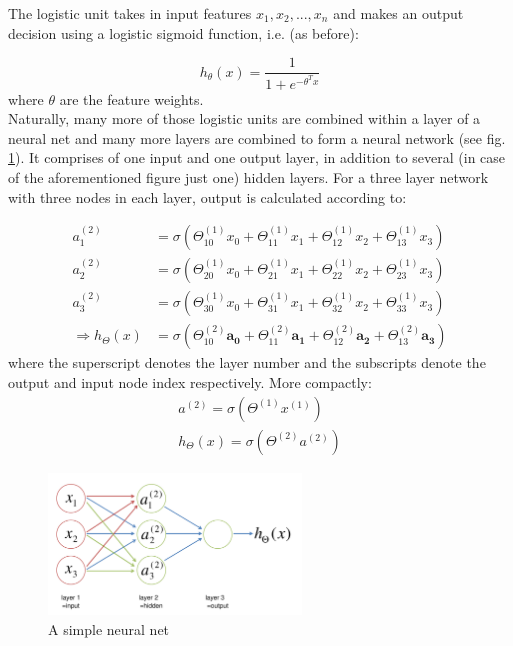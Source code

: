 \documentclass[a4paper, 12pt]{article}
\numberwithin{equation}{section}
\begin{document}
	The logistic unit takes in input features $x_1, x_2, ..., x_n$ and makes an output decision using a logistic sigmoid function, i.e. (as before):
	
	\begin{equation}
	h_\theta (x) = \frac{1}{1+e^{-\theta ^ T x}}
	\end{equation}
	where $\theta$ are the feature weights.\\
	
	Naturally, many more of those logistic units are combined within a layer of a neural net and many more layers are combined to form a neural network (see fig. \ref{fig:neural_net}). It comprises of one input and one output layer, in addition to several (in case of the aforementioned figure just one) hidden layers. For a three layer network with three nodes in each layer, output is calculated according to:
	
	\begin{align}
	a_1^{(2)} &= \sigma (\Theta_{10}^{(1)} x_0 + \Theta_{11}^{(1)} x_1  + \Theta_{12}^{(1)} x_2  + \Theta_{13}^{(1)} x_3) \\
	a_2^{(2)} &= \sigma (\Theta_{20}^{(1)} x_0 + \Theta_{21}^{(1)} x_1  + \Theta_{22}^{(1)} x_2  + \Theta_{23}^{(1)} x_3) \\
	a_3^{(2)} &= \sigma (\Theta_{30}^{(1)} x_0 + \Theta_{31}^{(1)} x_1  + \Theta_{32}^{(1)} x_2  + \Theta_{33}^{(1)} x_3) \\
	\Rightarrow h_{\Theta} (x) &= \sigma (\Theta_{10}^{(2)} \boldsymbol{a_0} + \Theta_{11}^{(2)} \boldsymbol{a_1}  + \Theta_{12}^{(2)} \boldsymbol{a_2}  + \Theta_{13}^{(2)} \boldsymbol{a_3})
	\end{align}
	where the superscript denotes the layer number and the subscripts denote the output and input node index respectively. More compactly:
	\begin{align}
	a^{(2)} = \sigma(\Theta^{(1)} x^{(1)}) \\
	h_{\Theta}(x) = \sigma(\Theta^{(2)} a^{(2)})
	\end{align}
	
	\begin{figure}[!h]
		\centering
		\includegraphics[page=1,width=0.60\textwidth]{neural_net.pdf}
		\caption{\label{fig:neural_net}{A simple neural net}}
	\end{figure}
	
\end{document}
